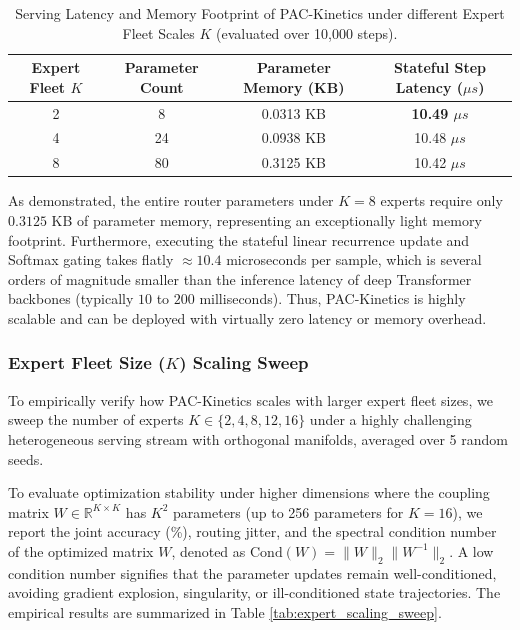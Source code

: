 \begin{table}[tb]
\centering
\caption{Serving Latency and Memory Footprint of PAC-Kinetics under different Expert Fleet Scales $K$ (evaluated over 10,000 steps).}
\label{tab:profiling}
\vskip 0.1in
\begin{tabular}{cccc}
\toprule
Expert Fleet $K$ & Parameter Count & Parameter Memory (KB) & Stateful Step Latency ($\mu s$) \\
\midrule
2 & 8 & 0.0313 KB & \textbf{10.49 $\mu s$} \\
4 & 24 & 0.0938 KB & 10.48 $\mu s$ \\
8 & 80 & 0.3125 KB & 10.42 $\mu s$ \\
\bottomrule
\end{tabular}
\end{table}

As demonstrated, the entire router parameters under $K=8$ experts require only $0.3125$ KB of parameter memory, representing an exceptionally light memory footprint. Furthermore, executing the stateful linear recurrence update and Softmax gating takes flatly $\approx 10.4$ microseconds per sample, which is several orders of magnitude smaller than the inference latency of deep Transformer backbones (typically $10$ to $200$ milliseconds). Thus, PAC-Kinetics is highly scalable and can be deployed with virtually zero latency or memory overhead.

\subsubsection{Expert Fleet Size ($K$) Scaling Sweep}
To empirically verify how PAC-Kinetics scales with larger expert fleet sizes, we sweep the number of experts $K \in \{2, 4, 8, 12, 16\}$ under a highly challenging heterogeneous serving stream with orthogonal manifolds, averaged over 5 random seeds. 

To evaluate optimization stability under higher dimensions where the coupling matrix $W \in \mathbb{R}^{K \times K}$ has $K^2$ parameters (up to 256 parameters for $K=16$), we report the joint accuracy (\%), routing jitter, and the spectral condition number of the optimized matrix $W$, denoted as $\text{Cond}(W) = \|W\|_2 \|W^{-1}\|_2$. A low condition number signifies that the parameter updates remain well-conditioned, avoiding gradient explosion, singularity, or ill-conditioned state trajectories. The empirical results are summarized in Table \ref{tab:expert_scaling_sweep}.

